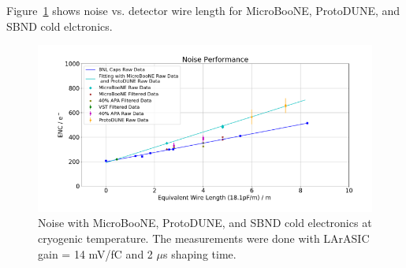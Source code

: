 \label{sec:appendix}

Figure~\ref{fig:noise_otherExps} shows noise vs. detector wire length for 
MicroBooNE, ProtoDUNE, and SBND cold elctronics. 
\begin{figure}[h!]
\centering
  \includegraphics[width=1.0\linewidth]{figures/noise_otherExps.png}
  \caption{Noise with MicroBooNE, ProtoDUNE, and SBND cold electronics at cryogenic temperature. The measurements were done
with LArASIC gain = 14 mV/fC and 2 $\mu$s shaping time.}
  \label{fig:noise_otherExps}
\end{figure}


